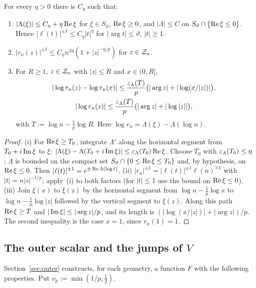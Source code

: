 \begin{lemma}\label{lem:pottersector}
For every $\eta>0$ there is $C_\eta$ such that:
\begin{enumerate}
\item[(i)] $|\Lambda(\xi)|\le C_\eta+\eta\operatorname{Re}\xi$ for $\xi\in S_\vartheta$, $\operatorname{Re}\xi\ge0$, and $|\Lambda|\le C$ on
  $S_\vartheta\cap\{\operatorname{Re}\xi\le0\}$. Hence $|\ell(t)|^{\pm1}\le C_\eta|t|^\eta$ for $|\arg t|\le\vartheta$,
  $|t|\ge1$.
\item[(ii)] $|r_n(z)|^{\pm1}\le C_\eta n^{2\eta}(1+|z|^{-\eta/p})$ for $z\in\mathcal{Z}_n$.
\item[(iii)] For $R\ge1$, $z\in\mathcal{Z}_n$ with $|z|\le R$ and $x\in(0,R]$,
  \begin{gather*}
    |\log r_n(z)-\log r_n(x)|\le\frac{\varepsilon_\Lambda(T)}p\bigl(|\arg z|+|\log(x/|z|)|\bigr),\\
    |\log r_n(z)|\le\frac{\varepsilon_\Lambda(T)}p\bigl(|\arg z|+|\log|z||\bigr),
  \end{gather*}
  with $T:=\log n-\frac1p\log R$. Here $\log r_n=\Lambda(\xi)-\Lambda(\log n)$.
\end{enumerate}
\end{lemma}

\begin{proof}
(i) For $\operatorname{Re}\xi\ge T_0$, integrate $\Lambda'$ along the horizontal segment from $T_0+i\operatorname{Im}\xi$ to $\xi$:
$|\Lambda(\xi)-\Lambda(T_0+i\operatorname{Im}\xi)|\le\varepsilon_\Lambda(T_0)\operatorname{Re}\xi$. Choose $T_0$ with $\varepsilon_\Lambda(T_0)\le\eta$; $\Lambda$
is bounded on the compact set $S_\vartheta\cap\{0\le\operatorname{Re}\xi\le T_0\}$ and, by hypothesis, on $\operatorname{Re}\xi\le0$. Then
$|\ell(t)|^{\pm1}=e^{\pm\operatorname{Re}\Lambda(\log t)}$.
(ii) $|r_n|^{\pm1}=|\ell(t)|^{\pm1}\ell(n)^{\mp1}$ with $|t|=n|z|^{-1/p}$; apply~(i) to both factors (for $|t|\le1$ use
the bound on $\operatorname{Re}\xi\le0$).
(iii) Join $\xi(x)$ to $\xi(z)$ by the horizontal segment from $\log n-\frac1p\log x$ to $\log n-\frac1p\log|z|$
followed by the vertical segment to $\xi(z)$. Along this path $\operatorname{Re}\xi\ge T$ and $|\operatorname{Im}\xi|\le|\arg z|/p$, and its length
is $(|\log(x/|z|)|+|\arg z|)/p$. The second inequality is the case $x=1$, since $r_n(1)=1$.
\end{proof}

\subsection{\texorpdfstring{The outer scalar and the jumps of $V$}{The outer scalar and the jumps of V}}\label{sec:frame-outer}
Section~\ref{sec:outer} constructs, for each geometry, a function $F$ with the following properties. Put
$\nu_p:=\min(1/p,\frac12)$.


